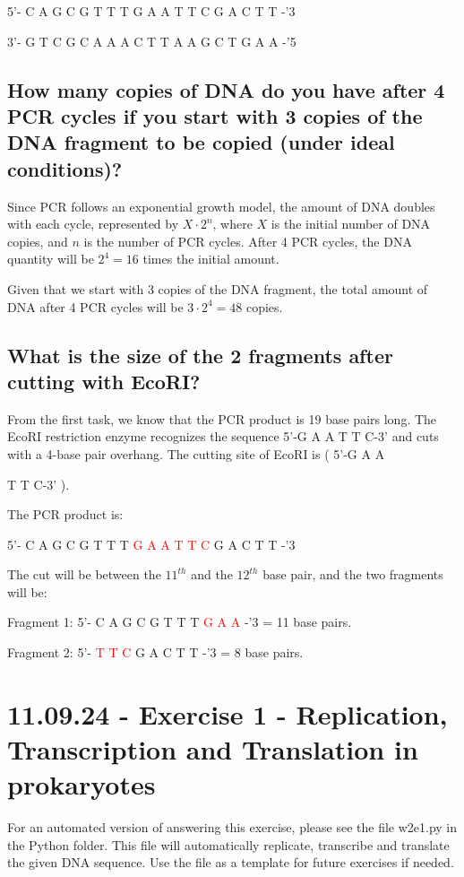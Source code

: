 5'- C A G C G T T T G A A T T C G A C T T -'3

3'- G T C G C A A A C T T A A G C T G A A -'5

\subsection*{How many copies of DNA do you have after 4 PCR cycles if you start with 3 copies of the DNA fragment to be copied (under ideal conditions)?}
Since PCR follows an exponential growth model, the amount of DNA doubles with each cycle, represented by $X \cdot 2^n$, where $X$ is the initial number of DNA copies, and $n$ is the number of PCR cycles. After 4 PCR cycles, the DNA quantity will be $2^4 = 16$ times the initial amount.

Given that we start with 3 copies of the DNA fragment, the total amount of DNA after 4 PCR cycles will be $3 \cdot 2^4 = 48$ copies.

\subsection*{What is the size of the 2 fragments after cutting with EcoRI?}
From the first task, we know that the PCR product is 19 base pairs long. The EcoRI restriction enzyme recognizes the sequence 5'-G A A T T C-3' and cuts with a 4-base pair overhang. The cutting site of EcoRI is 
(
    5'-G A A 
T T C-3'
). 

\vspace*{0.5em}
The PCR product is:

5'- C A G C G T T T \textcolor{red}{G A A T T C} G A C T T -'3

\vspace*{0.5em}
The cut will be between the $11^{th}$ and the $12^{th}$ base pair, and the two fragments will be:

Fragment 1: 5'- C A G C G T T T \textcolor{red}{G A A} -'3 = 11 base pairs.

Fragment 2: 5'- \textcolor{red}{T T C} G A C T T -'3 = 8 base pairs.

\section{11.09.24 - Exercise 1 - Replication, Transcription and Translation in prokaryotes}
For an automated version of answering this exercise, please see the file w2e1.py in the Python folder. This file will automatically replicate, transcribe and translate the given DNA sequence. Use the file as a template for future exercises if needed.

